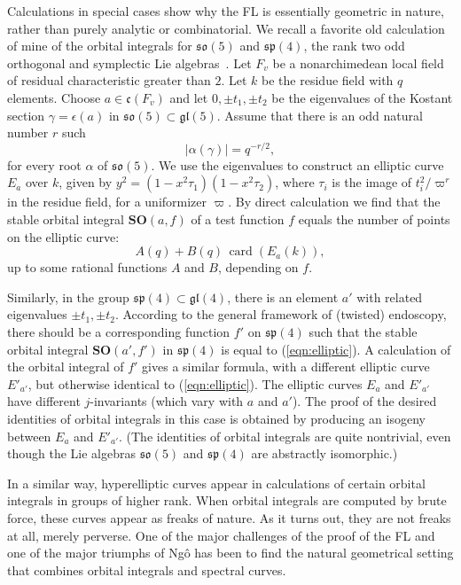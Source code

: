 \documentclass[brochure,english,12pt]{bourbaki}
\theoremstyle{plain}
\def\op#1{{\operatorname{#1}}}
\def\card{\op{card}}
\def\SO{{\mathbf {SO}}}
\def\so{\mathfrak{so}}
\def\sp{\mathfrak{sp}}
\def\gl{\mathfrak{gl}}
\def\cc{\mathfrak{c}}
\begin{document}
Calculations in special cases show why the FL is essentially geometric
in nature, rather than purely analytic or combinatorial. We recall a
favorite old calculation of mine of the orbital integrals for $\so(5)$
and $\sp(4)$, the rank two odd orthogonal and symplectic Lie
algebras~\cite{hyperelliptic-curves}.  Let $F_v$ be a nonarchimedean
local field of residual characteristic greater than $2$.  Let $k$ be
the residue field with $q$ elements.  Choose $a\in \cc(F_v)$  and let $0,\pm t_1,\pm t_2$ be
the eigenvalues of the Kostant section $\gamma=\epsilon(a)$ in $\so(5)\subset \gl(5)$.
Assume that there is an odd
natural number $r$ such
\[
|\alpha(\gamma)| = q^{-r/2},
\]
for every root $\alpha$ of $\so(5)$.  We use the eigenvalues to
construct an elliptic curve $E_a$ over $k$, given by $y^2 =
(1-x^2\tau_1)(1-x^2\tau_2)$, where $\tau_i$ is the image of
$t_i^2/\varpi^r$ in the residue field, for a uniformizer $\varpi$.  By
direct calculation we find that the stable orbital integral
$\SO(a,f)$ of a test function $f$ equals the number of points on the
elliptic curve:
\begin{equation}\label{eqn:elliptic}
A(q) + B(q)\, \card( E_a(k)),
\end{equation}
up to some rational functions $A$ and $B$, depending on $f$.

Similarly, in the group $\sp(4)\subset\gl(4)$, there is an element
${{a'}}$ with related eigenvalues $\pm t_1,\pm t_2$.  According to the
general framework of (twisted) endoscopy, there should be a
corresponding function $f'$ on $\sp(4)$ such that the stable orbital
integral $\SO(a',f')$ in $\sp(4)$ is equal to (\ref{eqn:elliptic}).  A
calculation of the orbital integral of $f'$ gives a similar formula,
with a different elliptic curve $E'_{{a'}}$, but otherwise identical
to (\ref{eqn:elliptic}).  The elliptic curves $E_a$ and $E'_{{a'}}$
have different $j$-invariants (which vary with $a$ and ${{a'}}$).  The
proof of the desired identities of orbital integrals in this case is
obtained by producing an isogeny between $E_a$ and $E'_{{a'}}$.  (The
 identities of orbital
integrals are quite nontrivial, even though the Lie algebras $\so(5)$
and $\sp(4)$ are abstractly isomorphic.)

In a similar way,  hyperelliptic curves
appear in calculations of certain orbital integrals in groups of
higher rank.  When orbital integrals are computed by brute force,
these curves appear as freaks of nature.  As it turns out, they are
not freaks at all, merely perverse.  One of the major challenges of
the proof of the FL and one of the major triumphs of Ng\^o has been to
find the natural geometrical setting that combines orbital integrals
and spectral curves.
\end{document}
